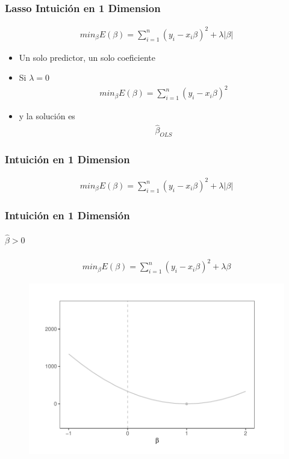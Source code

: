 \documentclass[
  shownotes,
  xcolor={svgnames},
  hyperref={colorlinks,citecolor=DarkBlue,linkcolor=andesred,urlcolor=DarkBlue}
  , aspectratio=169]{beamer}
\begin{document}
\begin{frame}[fragile]
\frametitle{Lasso Intuición en 1 Dimension}



\begin{align}
min_{\beta} E(\beta) = \sum_{i=1}^n (y_i-x_i \beta)^2 + \lambda|\beta| 
\end{align}

\begin{itemize}
  \item Un solo predictor, un solo coeficiente
  \medskip
  \item Si $\lambda=0$
\begin{align}
  min_{\beta} E(\beta) = \sum_{i=1}^n (y_i-x_i \beta)^2 
  \end{align}
  \item y la solución es
  \begin{align}
    \hat{\beta}_{OLS}
  \end{align}
  
\end{itemize}

\end{frame}
\begin{frame}[fragile,t]
\frametitle{Intuición en 1 Dimension}
\footnotesize
\begin{align}
 min_{\beta} E(\beta) = \sum_{i=1}^n (y_i-x_i \beta)^2 + \lambda|\beta| 
\end{align}



\end{frame}
\begin{frame}[fragile]
\frametitle{Intuición en 1 Dimensión}
\framesubtitle{ $\hat{\beta}>0$}
\footnotesize
\begin{align}
 min_{\beta} E(\beta) = \sum_{i=1}^n (y_i-x_i \beta)^2 + \lambda \beta 
\end{align}
   \begin{figure}[H] \centering
            \captionsetup{justification=centering}
              \includegraphics[scale=0.6]{figures/lasso1.pdf}
 \end{figure}




\end{frame}
\end{document}
